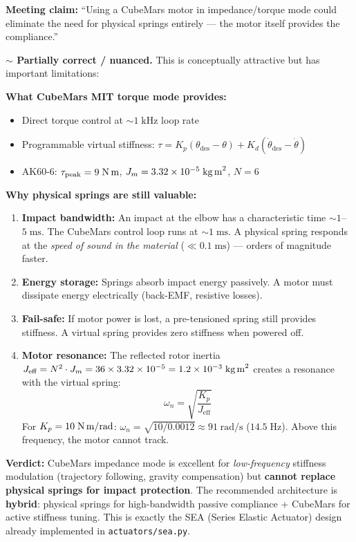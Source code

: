 \documentclass[11pt, a4paper]{article}
\newenvironment{nuanced}{%
  \begin{mdframed}[backgroundcolor=yellow!10, linecolor=orange!60!black]%
  \textbf{\color{orange!60!black}$\sim$\; Partially correct / nuanced.}\;}{\end{mdframed}}
\begin{document}
\noindent
\textbf{Meeting claim:} ``Using a CubeMars motor in impedance/torque mode
could eliminate the need for physical springs entirely --- the motor itself
provides the compliance.''

\begin{nuanced}
This is conceptually attractive but has important limitations:

\medskip\noindent
\textbf{What CubeMars MIT torque mode provides:}
\begin{itemize}[nosep]
  \item Direct torque control at $\sim 1\;\text{kHz}$ loop rate
  \item Programmable virtual stiffness: $\tau = K_p(\theta_{\text{des}} - \theta) + K_d(\dot\theta_{\text{des}} - \dot\theta)$
  \item AK60-6: $\tau_{\text{peak}} = 9\;\text{N\,m}$,
    $J_m = 3.32 \times 10^{-5}\;\text{kg\,m}^2$, $N = 6$
\end{itemize}

\medskip\noindent
\textbf{Why physical springs are still valuable:}
\begin{enumerate}[nosep]
  \item \textbf{Impact bandwidth:} An impact at the elbow has a
    characteristic time $\sim 1$--$5\;\text{ms}$.  The CubeMars control
    loop runs at $\sim 1\;\text{ms}$.  A physical spring responds at the
    \emph{speed of sound in the material} ($\ll 0.1\;\text{ms}$) ---
    orders of magnitude faster.
  \item \textbf{Energy storage:} Springs absorb impact energy passively.
    A motor must dissipate energy electrically (back-EMF, resistive losses).
  \item \textbf{Fail-safe:} If motor power is lost, a pre-tensioned spring
    still provides stiffness.  A virtual spring provides zero stiffness
    when powered off.
  \item \textbf{Motor resonance:} The reflected rotor inertia
    $J_{\text{eff}} = N^2 \cdot J_m = 36 \times 3.32 \times 10^{-5}
    = 1.2 \times 10^{-3}\;\text{kg\,m}^2$ creates a resonance with the
    virtual spring:
    \begin{equation}
      \omega_n = \sqrt{\frac{K_p}{J_{\text{eff}}}}
    \end{equation}
    For $K_p = 10\;\text{N\,m/rad}$:
    $\omega_n = \sqrt{10 / 0.0012} \approx 91\;\text{rad/s}$
    ($14.5\;\text{Hz}$).  Above this frequency, the motor cannot track.
\end{enumerate}

\medskip\noindent
\textbf{Verdict:} CubeMars impedance mode is excellent for \emph{low-frequency}
stiffness modulation (trajectory following, gravity compensation) but
\textbf{cannot replace physical springs for impact protection}.  The
recommended architecture is \textbf{hybrid}: physical springs for
high-bandwidth passive compliance + CubeMars for active stiffness tuning.
This is exactly the SEA (Series Elastic Actuator) design already implemented
in \texttt{actuators/sea.py}.
\end{nuanced}
\end{document}
